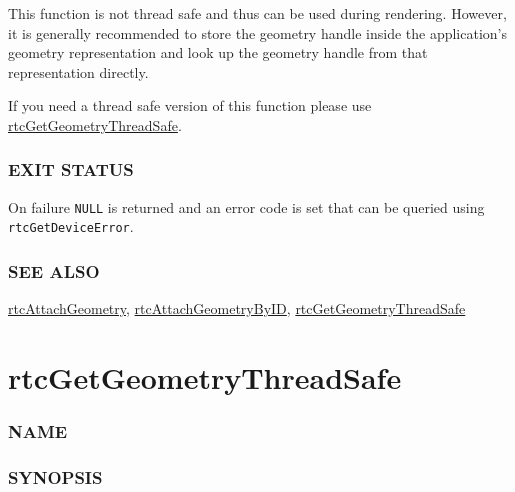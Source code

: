 This function is not thread safe and thus can be used during rendering.
However, it is generally recommended to store the geometry handle inside
the application's geometry representation and look up the geometry
handle from that representation directly.

If you need a thread safe version of this function please use
\hyperref[rtcgetgeometrythreadsafe]{rtcGetGeometryThreadSafe}.

\subsubsection{EXIT STATUS}\label{exit-status}

On failure \texttt{NULL} is returned and an error code is set that can
be queried using \texttt{rtcGetDeviceError}.

\subsubsection{SEE ALSO}\label{see-also}

\hyperref[rtcattachgeometry]{rtcAttachGeometry},
\hyperref[rtcattachgeometrybyid]{rtcAttachGeometryByID},
\hyperref[rtcgetgeometrythreadsafe]{rtcGetGeometryThreadSafe}

\pagebreak

\section{rtcGetGeometryThreadSafe}\label{rtcgetgeometrythreadsafe}

\subsubsection{NAME}\label{name}

\begin{Shaded}
\begin{Highlighting}[]
\OperatorTok{{-}}
\end{Highlighting}
\end{Shaded}

\subsubsection{SYNOPSIS}\label{synopsis}

\begin{Shaded}
\begin{Highlighting}[]

\OperatorTok{(}\OperatorTok{,}  \OperatorTok{);}
\end{Highlighting}
\end{Shaded}

